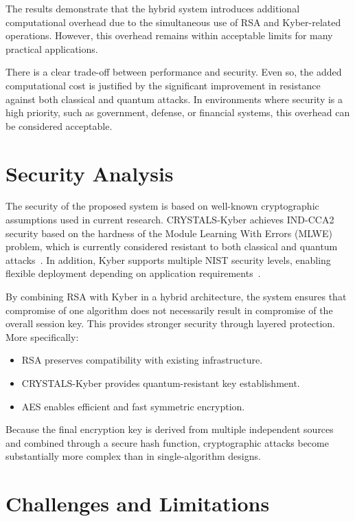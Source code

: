 \documentclass[12pt,a4paper]{article}
\begin{document}
The results demonstrate that the hybrid system introduces additional computational overhead due to the simultaneous use of RSA and Kyber-related operations. However, this overhead remains within acceptable limits for many practical applications.

There is a clear trade-off between performance and security. Even so, the added computational cost is justified by the significant improvement in resistance against both classical and quantum attacks. In environments where security is a high priority, such as government, defense, or financial systems, this overhead can be considered acceptable.

\section{Security Analysis}

The security of the proposed system is based on well-known cryptographic assumptions used in current research. CRYSTALS-Kyber achieves IND-CCA2 security based on the hardness of the Module Learning With Errors (MLWE) problem, which is currently considered resistant to both classical and quantum attacks~\cite{fips203,bos2018}. In addition, Kyber supports multiple NIST security levels, enabling flexible deployment depending on application requirements~\cite{fips203}.

By combining RSA with Kyber in a hybrid architecture, the system ensures that compromise of one algorithm does not necessarily result in compromise of the overall session key. This provides stronger security through layered protection. More specifically:
\begin{itemize}[leftmargin=2em]
    \item RSA preserves compatibility with existing infrastructure.
    \item CRYSTALS-Kyber provides quantum-resistant key establishment.
    \item AES enables efficient and fast symmetric encryption.
\end{itemize}

Because the final encryption key is derived from multiple independent sources and combined through a secure hash function, cryptographic attacks become substantially more complex than in single-algorithm designs.

\section{Challenges and Limitations}
\end{document}
